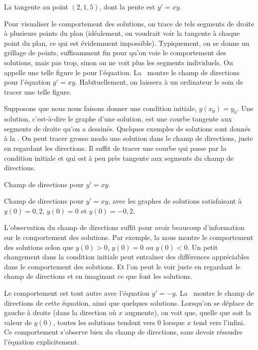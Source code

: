 \begin{myfig}
	\capstart {}
	\caption{La  tangente au point $(2 , 1,5)$, dont la pente est $y'=xy.$\label{1.3:fig0}}
\end{myfig}

Pour visualiser le comportement des solutions, on trace de tels segments de droite à plusieurs points du plan
(idéalement, on voudrait voir la tangente à chaque point du plan, ce qui est évidemment impossible).
Typiquement, on se donne un grillage de points, suffisamment fin pour qu'on voie le comportement des solutions,
mais pas trop, sinon on ne voit plus les segments individuels.
On appelle une telle figure le \emph{} pour l'équation.
La~ montre le champ de directions pour l'équation  $y' = xy$.
Habituellement, on laissera à un ordinateur le soin de tracer une telle figure.

Supposons que nous nous faisons donner une condition initiale, $y(x_0) = y_0$.
Une solution, c'est-à-dire le graphe d'une solution, est une courbe tangente aux segments de droite qu'on a dessinés.
Quelques exemples de solutions sont donnés à la  .
On peut tracer grosso modo une solution dans le champ de directions, juste en regardant les directions.
Il suffit de tracer une courbe qui passe par la condition initiale et qui est à peu près tangente aux segments du champ de directions.

\begin{myfig}
	\parbox[t]{3.0in}{
	 \capstart 	 {}
	 \caption{Champ de directions pour $y' = xy$.\label{1.3:fig1}}
	}
	\quad
	\parbox[t]{3.0in}{
	 \capstart 	 {}
	 \caption{Champ de directions pour $y' = xy$, avec les graphes de solutions satisfaisant à $y(0) = 0,2$, $y(0) = 0$ et $y(0) = -0,2$.\label{1.3:fig2}}
	}
\end{myfig}
L'observation du champ de directions suffit pour avoir beaucoup d'information sur le comportement des solutions.
Par exemple, la  nous montre le comportement des solutions selon que $y(0) > 0$, $y(0) = 0$ ou $y(0) < 0$.
Un petit changement dans la condition initiale peut entraîner des différences appréciables dans le comportement des solutions.
Et l'on peut le voir juste en regardant le champ de directions et en imaginant ce que font les solutions.

Le comportement est tout autre avec l'équation $y' = -y$.
La~ montre le champ de directions de cette équation, ainsi que quelques solutions.
Lorsqu'on se déplace de gauche à droite (dans la direction où $x$ augmente), on voit que, quelle que soit la valeur de $y(0)$,
toutes les solutions tendent vers 0 lorsque $x$ tend vers l'infini.
Ce comportement s'observe bien du champ de directions, sans devoir résoudre l'équation explicitement.


